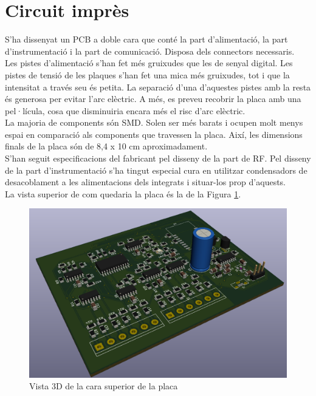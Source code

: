 \section{Circuit imprès}
S'ha dissenyat un PCB a doble cara que conté la part d'alimentació, la part d'instrumentació i la part de comunicació. Disposa dels connectors necessaris.\\
\newline Les pistes d'alimentació s'han fet més gruixudes que les de senyal digital. Les pistes de tensió de les plaques s'han fet una mica més gruixudes, tot i que la intensitat a través seu és petita. La separació d'una d'aquestes pistes amb la resta és generosa per evitar l'arc elèctric. A més, es preveu recobrir la placa amb una pel·lícula, cosa que disminuiria encara més el risc d'arc elèctric.\\
\newline La majoria de components són SMD. Solen ser més barats i ocupen molt menys espai en comparació als components que travessen la placa. Així, les dimensions finals de la placa són de 8,4 x 10 cm aproximadament.\\
\newline S'han seguit especificacions del fabricant pel disseny de la part de RF. Pel disseny de la part d'instrumentació s'ha tingut especial cura en utilitzar condensadors de desacoblament a les alimentacions dels integrats i situar-los prop d'aquests.\\
\newline La vista superior de com quedaria la placa és la de la Figura \ref{fig:3d_sup}.
\begin{figure}[H]
\begin{center}
\includegraphics[scale=0.32]{images/3d_1.png}
\end{center}
\caption{Vista 3D de la cara superior de la placa}
\label{fig:3d_sup}
\end{figure}

